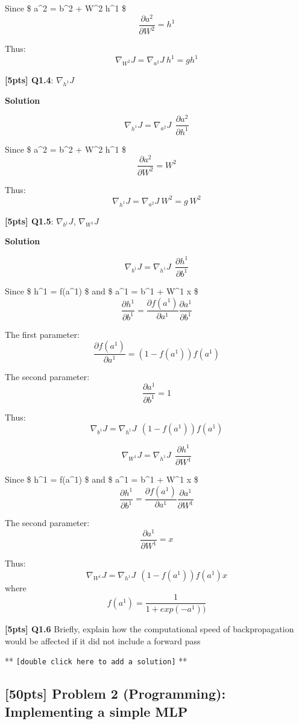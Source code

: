 \documentclass[11pt]{article}
\begin{document}
Since \$ a\^{}2 = b\^{}2 + W\^{}2 h\^{}1 \$
\[ \frac{\partial a^2}{\partial W^2} = h^1 \]

Thus: \[ \nabla_{W^2}J = \nabla_{a^2}J \ h^1  = g h^1\]

    \textbf{{[}5pts{]} Q1.4}: \(\nabla_{h^1}J\)

    \textbf{Solution}

\[ \nabla_{h^1}J = \nabla_{a^2}J \ \ \frac{\partial a^2}{\partial h^1} \]

Since \$ a\^{}2 = b\^{}2 + W\^{}2 h\^{}1 \$
\[ \frac{\partial a^2}{\partial W^2} = W^2 \]

Thus: \[ \nabla_{h^1}J = \nabla_{a^2}J \ W^2 = g \ W^2  \]

    \textbf{{[}5pts{]} Q1.5}: \(\nabla_{b^1}J\), \(\nabla_{W^1}J\)

    \textbf{Solution}

\[ \nabla_{b^1}J = \nabla_{h^1}J \ \ \frac{\partial h^1}{\partial b^1} \]

Since \$ h\^{}1 = f(a\^{}1) \$ and \$ a\^{}1 = b\^{}1 + W\^{}1 x \$
\[ \frac{\partial h^1}{\partial b^1} = \frac{\partial f(a^1)}{\partial a^1} \frac{\partial a^1}{\partial b^1}  \]

The first parameter:
\[ \frac{\partial f(a^1)}{\partial a^1} = (1 - f(a^1))f(a^1) \]

The second parameter: \[ \frac{\partial a^1}{\partial b^1} = 1 \]

Thus: \[ \nabla_{b^1}J = \nabla_{h^1}J \ \ (1 - f(a^1))f(a^1) \]

\[ \nabla_{W^1}J = \nabla_{h^1}J \ \ \frac{\partial h^1}{\partial W^1} \]

Since \$ h\^{}1 = f(a\^{}1) \$ and \$ a\^{}1 = b\^{}1 + W\^{}1 x \$
\[ \frac{\partial h^1}{\partial b^1} = \frac{\partial f(a^1)}{\partial a^1} \frac{\partial a^1}{\partial W^1}  \]

The second parameter: \[ \frac{\partial a^1}{\partial W^1} = x \]

Thus: \[ \nabla_{W^1}J = \nabla_{h^1}J \ \ (1 - f(a^1))f(a^1)x \] where
\[ f(a^1) = \frac{1}{1+exp(-a^1))} \]

    \textbf{{[}5pts{]} Q1.6} Briefly, explain how the computational speed of
backpropagation would be affected if it did not include a forward pass

    ** \texttt{{[}double\ click\ here\ to\ add\ a\ solution{]}} **

    \hypertarget{pts-problem-2-programming-implementing-a-simple-mlp}{%
\subsection{{[}50pts{]} Problem 2 (Programming): Implementing a simple
MLP}\label{pts-problem-2-programming-implementing-a-simple-mlp}}
\end{document}
